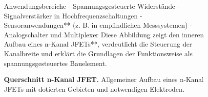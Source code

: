 {\begin{figure}[H]
{            Anwendungsbereiche
            - Spannungsgesteuerte Widerstände
            - Signalverstärker in Hochfrequenzschaltungen
            - Sensoranwendungen** (z. B. in empfindlichen Messsystemen)
            - Analogschalter und Multiplexer
            Diese Abbildung zeigt den inneren Aufbau eines n-Kanal JFETs**, verdeutlicht die Steuerung der Kanalbreite und erklärt die Grundlagen der Funktionsweise als spannungsgesteuertes Bauelement.}
        \caption{\textbf{Querschnitt n-Kanal JFET.} Allgemeiner Aufbau eines n-Kanal JFETs mit dotierten Gebieten und
            notwendigen Elektroden.}
        \label{fig:QuerschnittN-KanalJFET}
    \end{figure}
}




